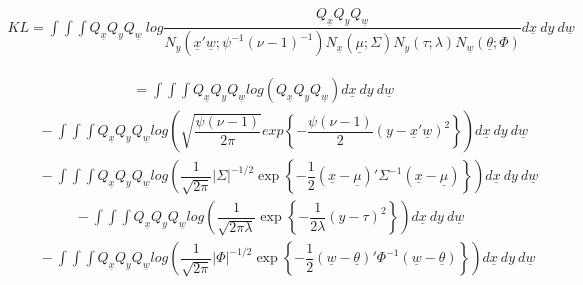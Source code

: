 \documentclass[fleqn]{minimal}
\begin{document}
\begin{align*}
  KL =
  \int \int \int
  Q_{\underline{x}} Q_{y} Q_{\underline{w}}
  \ log
  \dfrac
  {
    Q_{\underline{x}} Q_{y} Q_{\underline{w}}
  }
  {
    N_y\left(\underline{x}'\underline{w} ; \psi^{-1}\left(\nu-1\right)^{-1}\right)
    N_{\underline{x}} \left( \underline{\mu} ; \Sigma\right)
    N_{y} \left( \tau ; \lambda\right)
    N_{\underline{w}} \left( \underline{\theta} ; \Phi\right)
  }
  d\underline{x} \ dy \ d\underline{w}
\end{align*}

\begin{align*}
  \ \ \ \ \ \
  = 
  \int \int \int Q_{\underline{x}} Q_{y} Q_{\underline{w}}  
  log \left(
    Q_{\underline{x}} Q_{y} Q_{\underline{w}}  
  \right)
  d\underline{x} \ dy \ d\underline{w}
\end{align*}
\begin{align*}
  \ \ \ \ \ \ \ \ \ \
  - \int \int \int Q_{\underline{x}} Q_{y} Q_{\underline{w}}  
  log \left(
    \sqrt{\dfrac{\psi\left(\nu-1\right)}{2\pi}}
    exp
    \left\{
      -\dfrac{\psi\left(\nu-1\right)}{2}
      \left( y - \underline{x}'\underline{w}\right)^2
    \right\}
  \right)
  d\underline{x} \ dy \ d\underline{w}
\end{align*}
\begin{align*}
  \ \ \ \ \ \ \ \ \ \
  - \int \int \int Q_{\underline{x}} Q_{y} Q_{\underline{w}}  
  log \left(
    \dfrac{1}{\sqrt{2\pi}}
    \left| \Sigma \right|^{-1/2}
    \exp
    \left\{
      - \dfrac{1}{2}
      \left( \underline{x} - \underline{\mu}\right)'
      \Sigma^{-1}
      \left( \underline{x} - \underline{\mu}\right)
    \right\}
  \right)
  d\underline{x} \ dy \ d\underline{w}
\end{align*}
\begin{align*}
  \ \ \ \ \ \ \ \ \ \
  - \int \int \int Q_{\underline{x}} Q_{y} Q_{\underline{w}}  
  log \left(
    \dfrac{1}{\sqrt{2\pi\lambda}}
    \exp
    \left\{
      - \dfrac{1}{2\lambda}
      \left(y - \tau\right)^2
    \right\}
  \right)
  d\underline{x} \ dy \ d\underline{w}
\end{align*}
\begin{align*}
  \ \ \ \ \ \ \ \ \ \
  - \int \int \int Q_{\underline{x}} Q_{y} Q_{\underline{w}}  
  log \left(
    \dfrac{1}{\sqrt{2\pi}}
    \left| \Phi \right|^{-1/2}
    \exp
    \left\{
      - \dfrac{1}{2}
      \left( \underline{w} - \underline{\theta}\right)'
      \Phi^{-1}
      \left( \underline{w} - \underline{\theta}\right)
    \right\}
  \right)
  d\underline{x} \ dy \ d\underline{w}
\end{align*}
\end{document}
